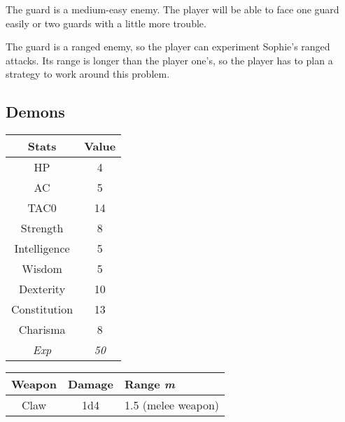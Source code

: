 The guard is a medium-easy enemy. The player will be able to face one guard easily or two guards with a little more trouble.

The guard is a ranged enemy, so the player can experiment Sophie's ranged attacks. Its range is longer than the player one's, so the player has to plan a strategy to work around this problem.

\subsection{Demons}
\begin{table}[H]
  \centering
  \begin{tabular}{|c|c|}
    \hline
    \rowcolor[HTML]{C0C0C0}
    \textbf{Stats} & \textbf{Value} \\ \hline
    HP & 4 \\ \hline
    AC & 5 \\ \hline
    TAC0 & 14 \\ \hline
    Strength & 8 \\ \hline
    Intelligence & 5 \\ \hline
    Wisdom & 5  \\ \hline
    Dexterity & 10 \\ \hline
    Constitution & 13 \\ \hline
    Charisma & 8 \\ \hline
    \textit{Exp} & \textit{50} \\ \hline
  \end{tabular}
\end{table}
\begin{table}[H]
  \centering
  \begin{tabular}{|l|l|l|}
    \hline
    \rowcolor[HTML]{C0C0C0}
    \textbf{Weapon} & \textbf{Damage} & \textbf{Range \textit{m}} \\ \hline
    \multicolumn{1}{|c|}{Claw} & \multicolumn{1}{c|}{1d4} & \multicolumn{1}{c|}{1.5 (melee weapon)} \\ \hline
  \end{tabular}
\end{table}


